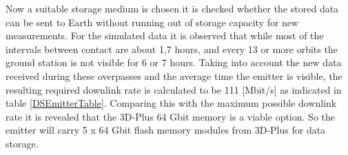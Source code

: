 Now a suitable storage medium is chosen it is checked whether the stored data can be sent to Earth without running out of storage capacity for new measurements. For the simulated data it is observed that while most of the intervals between contact are about 1,7 hours, and every 13 or more orbits the ground station is not visible for 6 or 7 hours. Taking into account the new data received during these overpasses and the average time the emitter is visible, the resulting required downlink rate is calculated to be 111 [Mbit/s] as indicated in table \ref{DSEmitterTable}. Comparing this with the maximum possible downlink rate it is revealed that the 3D-Plus 64 Gbit memory is a viable option. So the emitter will carry 5 x 64 Gbit flash memory modules from 3D-Plus for data storage.
